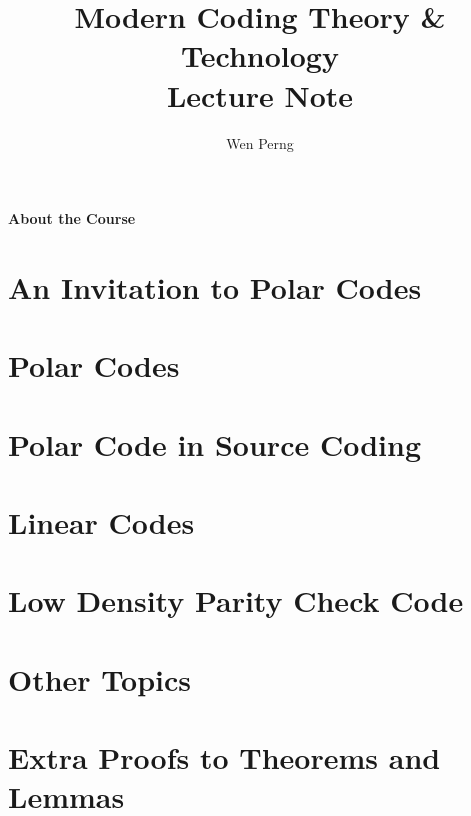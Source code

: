 \documentclass{lectureNotes}
\begin{document}
\begin{titlepage}
    \title{Modern Coding Theory \& Technology \\Lecture Note}
    \author{Wen Perng}
    \maketitle
\end{titlepage}

\setcounter{page}{1}
\begin{center}
    {\Large\textbf{About the Course}}
\end{center}

\newpage

\setcounter{tocdepth}{1}
\tableofcontents

\chapter{An Invitation to Polar Codes}

\chapter{Polar Codes}



\chapter{Polar Code in Source Coding}



\chapter{Linear Codes}




\chapter{Low Density Parity Check Code}


\chapter{Other Topics}




\newpage
{}
\printbibliography
\nocite{*}

\appendix
% 
\chapter{Extra Proofs to Theorems and Lemmas}


\end{document}
